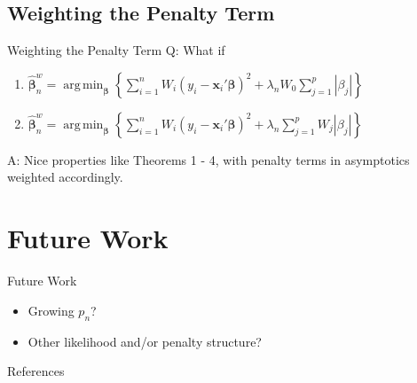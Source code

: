 \documentclass{beamer}
\DeclareMathOperator*{\argmin}{arg\,min}
\newcommand{\bnw}{\widehat{\bm{\beta}}_n^w} %
\newcommand{\be}{\bm{\beta}} %
\newcommand{\sumin}{\sum_{i=1}^n} %
\newcommand{\x}{\bm{x}_i} %
\begin{document}
\subsection{Weighting the Penalty Term} 

\begin{frame}{Weighting the Penalty Term}
Q: What if 
\begin{enumerate}
	\item $\bnw = 
		\argmin_{\be} 
		\left\{ 
			\sumin W_i ( y_i - \x' \be )^2 
			+ \lambda_n W_0 \sum_{j=1}^p |\beta_j| 
		\right\}$
	\item $\bnw = 
		\argmin_{\be} 
		\left\{ 
			\sumin W_i ( y_i - \x' \be )^2 
			+ \lambda_n \sum_{j=1}^p W_j |\beta_j| 
		\right\}
$\end{enumerate}
\vspace{0.5cm}
A: Nice properties like Theorems 1 - 4, with penalty terms in asymptotics weighted accordingly. 
\end{frame}

\section{Future Work}

\begin{frame}{Future Work}
\begin{itemize}
	\item Growing $p_n$?
	\item Other likelihood and/or penalty structure?
\end{itemize}
\end{frame}

\begin{frame}[noframenumbering]{References}
		
	{\footnotesize
		        
	} 
\end{frame}
\end{document}

